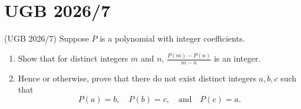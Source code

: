\documentclass[numbers=endperiod, 11pt]{scrartcl}
\begin{document}
\section{UGB 2026/7}

\begin{prob*}{(UGB 2026/7)}{}
    Suppose $P$ is a polynomial with integer coefficients.
    \begin{enumerate}[label=\alph*)]
        \item Show that for distinct integers $m$ and
              $n$, $\frac{P(m) - P(n)}{m - n}$ is an
              integer.
        \item Hence or otherwise, prove that there do
              not exist distinct integers $a, b, c$
              such that
              \[P(a) = b, \quad P(b) = c, \quad \text{and} \quad P(c) = a.\]
    \end{enumerate}
\end{prob*}
\end{document}
